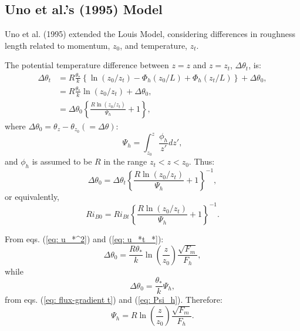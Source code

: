 \subsection{Uno et al.’s (1995) Model}
Uno et al. (1995) extended the Louis Model,
considering differences in roughness length related to momentum, $z_0$, and temperature, $z_t$.

The potential temperature difference between $z=z$ and $z=z_t$,
$\Delta\theta_t$, is:
\begin{align}
  \Delta\theta_t
  &= R\frac{\theta_*}{k}\left\{\ln(z_0/z_t) - \Phi_h(z_0/L) + \Phi_h(z_t/L)\right\} + \Delta\theta_0, \nonumber \\
  &= R\frac{\theta_*}{k}{\ln(z_0/z_t)} + \Delta\theta_0, \nonumber \\
  &= \Delta\theta_0 \left\{\frac{R\ln(z_0/z_t)}{\Psi_h} + 1\right\},
\end{align}
where $\Delta\theta_0 = \theta_z - \theta_{z_0} (=\Delta\theta)$:
\begin{equation}
  \Psi_h = \int_{z_0}^z\frac{\phi_h}{z'}dz', \label{eq: Psi_h}
\end{equation}
and $\phi_h$ is assumed to be $R$ in the range $z_t < z < z_0$.
Thus:
\begin{equation}
  \Delta\theta_0 = \Delta\theta_t \left\{\frac{R\ln(z_0/z_t)}{\Psi_h}+1\right\}^{-1},
  \label{eq: Delta t_0}
\end{equation}
or equivalently,
\begin{equation}
  Ri_{B0} = Ri_{Bt} \left\{\frac{R\ln(z_0/z_t)}{\Psi_h}+1\right\}^{-1}.
  \label{eq: Ri_B0}
\end{equation}

From eqs. (\ref{eq: u_*^2}) and (\ref{eq: u_*t_*}):
\begin{equation}
  \Delta\theta_0 = \frac{R\theta_*}{k}\ln\left(\frac{z}{z_0}\right)\frac{\sqrt{F_m}}{F_h},
\end{equation}
while
\begin{equation}
  \Delta\theta_0 = \frac{\theta_*}{k}\Psi_h,
\end{equation}
from eqs. (\ref{eq: flux-gradient t}) and (\ref{eq: Psi_h}).
Therefore:
\begin{equation}
  \Psi_h = R\ln\left(\frac{z}{z_0}\right)\frac{\sqrt{F_m}}{F_h}.
  \label{eq: Psi}
\end{equation}

